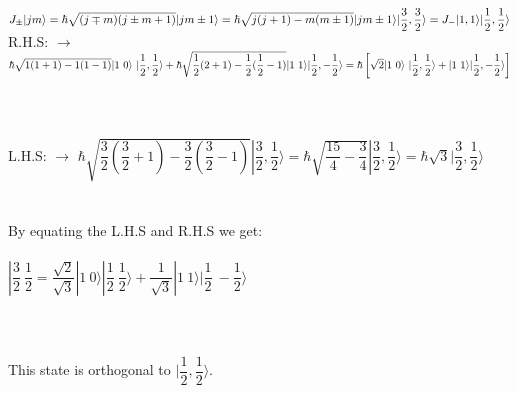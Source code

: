 \documentclass[fleqn]{article}
\begin{document}
\begin{enumerate}
\begin{enumerate}
        \textcolor{hwColor}{
          \\
          $
            J_{\pm}|jm \rangle=\hbar \sqrt{(j \mp m)(j \pm m+1)}|jm \pm 1 \rangle=\hbar \sqrt{j(j+1)-m(m \pm 1)}|jm \pm 1 \rangle
            \\
            \\
            \\
            | \dfrac{3}{2}, \dfrac{3}{2} \rangle=J_- |1,1 \rangle | \dfrac{1}{2}, \dfrac{1}{2} \rangle
            \\
            \\
          $
          R.H.S: $\rightarrow$
          $
            \hbar \sqrt{1(1+1)-1(1-1)} |1 ~ 0 \rangle ~ | \dfrac{1}{2}, \dfrac{1}{2} \rangle
            +\hbar \sqrt{\dfrac{1}{2} (2+1)-\dfrac{1}{2} (\dfrac{1}{2}-1)} |1 ~ 1 \rangle |\dfrac{1}{2}, -\dfrac{1}{2} \rangle
            \\
            \\
            =\hbar \left[
              \sqrt{2} |1 ~ 0\rangle ~ | \dfrac{1}{2}, \dfrac{1}{2} \rangle
              +|1 ~ 1 \rangle |\dfrac{1}{2}, -\dfrac{1}{2} \rangle
            \right]
          $
          \\
          \\
          \\
          \\
          L.H.S: $\rightarrow$
          $
            \hbar \sqrt{\dfrac{3}{2} (\dfrac{3}{2}+1)-\dfrac{3}{2} (\dfrac{3}{2}-1)} |\dfrac{3}{2}, \dfrac{1}{2} \rangle
            =\hbar \sqrt{\dfrac{15}{4}-\dfrac{3}{4}} |\dfrac{3}{2}, \dfrac{1}{2} \rangle
            =\hbar \sqrt{3} |\dfrac{3}{2}, \dfrac{1}{2} \rangle
          $
          \\
          \\
          \\
          By equating the L.H.S and R.H.S we get:
          \\
          \\
          $
            |\dfrac{3}{2} ~ \dfrac{1}{2}=\dfrac{\sqrt{2}}{\sqrt{3}} |1 ~ 0 \rangle |\dfrac{1}{2} ~ \dfrac{1}{2} \rangle
            +\dfrac{1}{\sqrt{3}} |1 ~ 1 \rangle |\dfrac{1}{2} ~ -\dfrac{1}{2} \rangle
          $
          \\
          \\
          \\
          \\
          This state is orthogonal to $|\dfrac{1}{2}, \dfrac{1}{2} \rangle$. 
          \\
}
\end{enumerate}
\end{enumerate}
\end{document}
